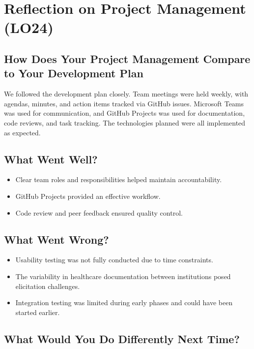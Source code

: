 \documentclass{article}
\begin{document}
 \section{Reflection on Project Management (LO24)}
 
 \subsection{How Does Your Project Management Compare to Your Development Plan}
 
 We followed the development plan closely. Team meetings were held weekly, with agendas, minutes, and action items tracked via GitHub issues. Microsoft Teams was used for communication, and GitHub Projects was used for documentation, code reviews, and task tracking. The technologies planned were all implemented as expected.
 
 \subsection{What Went Well?}
 
 \begin{itemize}
     \item Clear team roles and responsibilities helped maintain accountability.
     \item GitHub Projects provided an effective workflow.
     \item Code review and peer feedback ensured quality control.
 \end{itemize}
 
 \subsection{What Went Wrong?}
 
 \begin{itemize}
     \item Usability testing was not fully conducted due to time constraints.
     \item The variability in healthcare documentation between institutions posed elicitation challenges.
     \item Integration testing was limited during early phases and could have been started earlier.
 \end{itemize}
 
 \subsection{What Would You Do Differently Next Time?}
 
\end{document}
